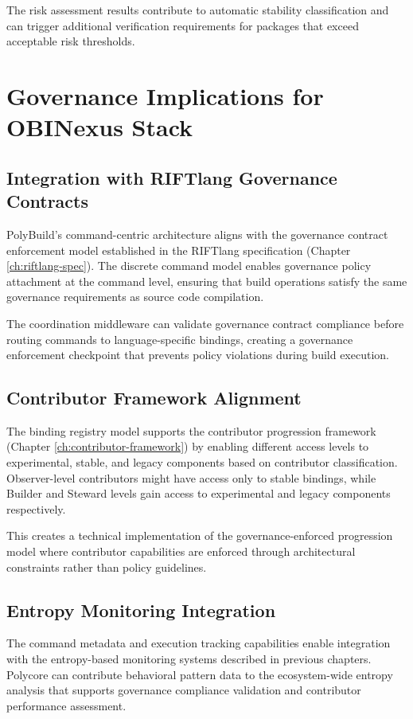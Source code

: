 The risk assessment results contribute to automatic stability classification and can trigger additional verification requirements for packages that exceed acceptable risk thresholds.

\section{Governance Implications for OBINexus Stack}

\subsection{Integration with RIFTlang Governance Contracts}

PolyBuild's command-centric architecture aligns with the governance contract enforcement model established in the RIFTlang specification (Chapter \ref{ch:riftlang-spec}). The discrete command model enables governance policy attachment at the command level, ensuring that build operations satisfy the same governance requirements as source code compilation.

The coordination middleware can validate governance contract compliance before routing commands to language-specific bindings, creating a governance enforcement checkpoint that prevents policy violations during build execution.

\subsection{Contributor Framework Alignment}

The binding registry model supports the contributor progression framework (Chapter \ref{ch:contributor-framework}) by enabling different access levels to experimental, stable, and legacy components based on contributor classification. Observer-level contributors might have access only to stable bindings, while Builder and Steward levels gain access to experimental and legacy components respectively.

This creates a technical implementation of the governance-enforced progression model where contributor capabilities are enforced through architectural constraints rather than policy guidelines.

\subsection{Entropy Monitoring Integration}

The command metadata and execution tracking capabilities enable integration with the entropy-based monitoring systems described in previous chapters. Polycore can contribute behavioral pattern data to the ecosystem-wide entropy analysis that supports governance compliance validation and contributor performance assessment.


